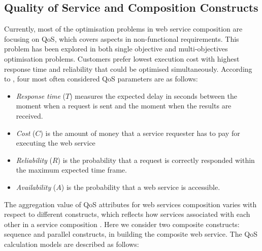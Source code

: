 \documentclass{IEEEtran}
\begin{document}
\subsection{Quality of Service and Composition Constructs}\label{Quality of Service and Composition Constructs}
Currently, most of the optimisation problems \cite{feng2013dynamic,huang2009effective,ma2015hybrid,da2014graph} in web service composition are focusing on QoS, which covers aspects in non-functional requirements. This problem has been explored in both single objective and multi-objectives optimisation problems. Customers prefer lowest execution cost with highest response time and reliability that could be optimised simultaneously. According to \cite{zeng2003quality}, four most often considered QoS parameters are as follows:
\begin{itemize}
\item \textit{Response time} ($T$) measures the expected delay in seconds between the moment when a request is sent and the moment when the results are received.
\item \textit{Cost} ($C$) is the amount of money that a service requester has to pay for executing the web service
\item \textit{Reliability} ($R$) is the probability that a request is correctly responded within the maximum expected time frame.
\item \textit{Availability} ($A$) is the probability that a web service is accessible.
\end{itemize}
The aggregation value of QoS attributes for web services composition varies with respect to different constructs, which reflects how services associated with each other in a service composition \cite{zeng2003quality}. Here we consider two composite constructs: sequence and parallel constructs, in building the composite web service. The QoS calculation models are described as follows:
\end{document}
